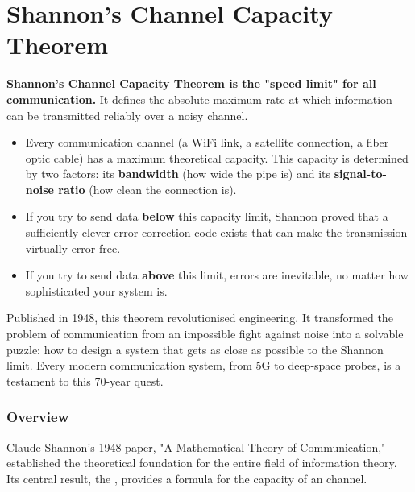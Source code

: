 
\chapter{Shannon's Channel Capacity Theorem}
\label{ch:shannon}

\begin{nontechnical}
    \textbf{Shannon's Channel Capacity Theorem is the "speed limit" for all communication.} It defines the absolute maximum rate at which information can be transmitted reliably over a noisy channel.

    \begin{itemize}
        \item Every communication channel (a WiFi link, a satellite connection, a fiber optic cable) has a maximum theoretical capacity. This capacity is determined by two factors: its \textbf{bandwidth} (how wide the pipe is) and its \textbf{signal-to-noise ratio} (how clean the connection is).
        \item If you try to send data \textbf{below} this capacity limit, Shannon proved that a sufficiently clever error correction code exists that can make the transmission virtually error-free.
        \item If you try to send data \textbf{above} this limit, errors are inevitable, no matter how sophisticated your system is.
    \end{itemize}

     Published in 1948, this theorem revolutionised engineering. It transformed the problem of communication from an impossible fight against noise into a solvable puzzle: how to design a system that gets as close as possible to the Shannon limit. Every modern communication system, from 5G to deep-space probes, is a testament to this 70-year quest.
\end{nontechnical}


\subsection{Overview}

Claude Shannon's 1948 paper, "A Mathematical Theory of Communication," established the theoretical foundation for the entire field of information theory. Its central result, the , provides a formula for the capacity of an  channel.

